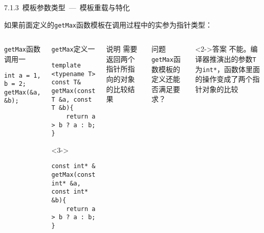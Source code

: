 \begin{frame}[fragile]{7.1.3~模板参数类型\normalsize{~---~模板重载与特化}}

如果前面定义的\texttt{getMax}函数模板在调用过程中的实参为指针类型：

\vspace{-4mm}

\begin{columns}[t]

\begin{blueblock}{\texttt{getMax}函数调用一}
\begin{lstlisting}[moreemph={T}]
int a = 1, b = 2;
getMax(&a, &b);
\end{lstlisting}
\end{blueblock}
\begin{blueblock}{\texttt{getMax}定义一}
\begin{lstlisting}[moreemph={T}]
template <typename T>
const T& getMax(const T &a, const T &b){
    return a > b ? a : b;
}
\end{lstlisting}
\begin{onlyenv}<3->
\begin{lstlisting}[moreemph={T}]
const int* & getMax(const int* &a, const int* &b){
    return a > b ? a : b;
}
\end{lstlisting}
\end{onlyenv}
\end{blueblock}

\begin{yellowblock}{说明}
需要返回两个指针所指向的对象的比较结果
\end{yellowblock}
\begin{greenblock}{问题}
\texttt{getMax}函数模板的定义还能否满足要求？
\end{greenblock}
\begin{greenblock}<2->{答案}
不能。编译器推演出的参数\texttt{T}为\texttt{int*}，函数体里面的操作变成了两个指针对象的比较
\end{greenblock}

\end{columns}

\end{frame}


